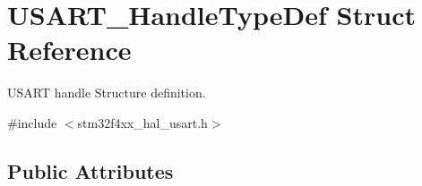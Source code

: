 \hypertarget{struct_u_s_a_r_t___handle_type_def}{}\section{U\+S\+A\+R\+T\+\_\+\+Handle\+Type\+Def Struct Reference}
\label{struct_u_s_a_r_t___handle_type_def}


U\+S\+A\+RT handle Structure definition.  




{\ttfamily \#include $<$stm32f4xx\+\_\+hal\+\_\+usart.\+h$>$}

\subsection*{Public Attributes}
